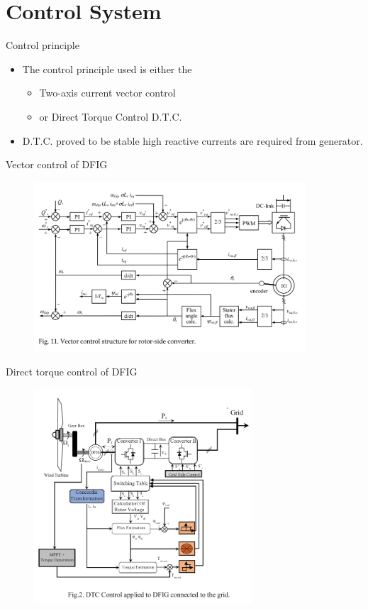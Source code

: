 \documentclass{beamer}
\begin{document}
\section{Control System}

\begin{frame}{Control principle}

\begin{itemize}
 \item  The control principle used is either the 

\begin{itemize}
    \item Two-axis current vector control 
    \item or Direct Torque Control D.T.C.
\end{itemize}

\item D.T.C. proved to be stable high reactive currents are required from generator.
\end{itemize}

\end{frame}



\begin{frame}{Vector control of DFIG}
    \begin{figure}
        \centering
        \includegraphics[width=4in]{imgs/rotorSideConv.png}
    \end{figure}    
\end{frame}



\begin{frame}{Direct torque control of DFIG}
    \begin{figure}
        \centering
        \includegraphics[width=3.2in]{imgs/DTCrotor.png}
    \end{figure}    
\end{frame}
\end{document}
